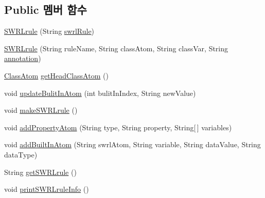 \subsection*{Public 멤버 함수}
\begin{DoxyCompactItemize}
\item 
\mbox{\hyperlink{classcom_1_1github_1_1aites_1_1framework_1_1rule_1_1_s_w_r_lrule_a984917d455fb3d9bf7aecf46bfef72cd}{S\+W\+R\+Lrule}} (String \mbox{\hyperlink{classcom_1_1github_1_1aites_1_1framework_1_1rule_1_1_s_w_r_lrule_adde1291a731073840a5ac9e535bf6f3f}{swrl\+Rule}})
\item 
\mbox{\hyperlink{classcom_1_1github_1_1aites_1_1framework_1_1rule_1_1_s_w_r_lrule_ae70ff52287865719636e6c63ece1fcd2}{S\+W\+R\+Lrule}} (String rule\+Name, String class\+Atom, String class\+Var, String \mbox{\hyperlink{classcom_1_1github_1_1aites_1_1framework_1_1rule_1_1_s_w_r_lrule_af98a0b14045d483b30ad511f0627fe3f}{annotation}})
\item 
\mbox{\hyperlink{classcom_1_1github_1_1aites_1_1framework_1_1rule_1_1_s_w_r_lrule_1_1_class_atom}{Class\+Atom}} \mbox{\hyperlink{classcom_1_1github_1_1aites_1_1framework_1_1rule_1_1_s_w_r_lrule_ac1db206d60cb8bea838593d3e0dcfd02}{get\+Head\+Class\+Atom}} ()
\item 
void \mbox{\hyperlink{classcom_1_1github_1_1aites_1_1framework_1_1rule_1_1_s_w_r_lrule_a4bdc9396085aa17600949d679657c2ad}{update\+Bulit\+In\+Atom}} (int bulit\+In\+Index, String new\+Value)
\item 
void \mbox{\hyperlink{classcom_1_1github_1_1aites_1_1framework_1_1rule_1_1_s_w_r_lrule_a8b6f04d7d532e8150e4be3ba796c28e9}{make\+S\+W\+R\+Lrule}} ()
\item 
void \mbox{\hyperlink{classcom_1_1github_1_1aites_1_1framework_1_1rule_1_1_s_w_r_lrule_ac6d5eaf0c61fd53ba7934558557c2f9a}{add\+Property\+Atom}} (String type, String property, String\mbox{[}$\,$\mbox{]} variables)
\item 
void \mbox{\hyperlink{classcom_1_1github_1_1aites_1_1framework_1_1rule_1_1_s_w_r_lrule_a59ae07c448962dabb798a34e54b5e72b}{add\+Built\+In\+Atom}} (String swrl\+Atom, String variable, String data\+Value, String data\+Type)
\item 
String \mbox{\hyperlink{classcom_1_1github_1_1aites_1_1framework_1_1rule_1_1_s_w_r_lrule_ab194dfde2668dca1f79b533695d71e67}{get\+S\+W\+R\+Lrule}} ()
\item 
void \mbox{\hyperlink{classcom_1_1github_1_1aites_1_1framework_1_1rule_1_1_s_w_r_lrule_ac24b01677beb4d4004f41cf1da585497}{print\+S\+W\+R\+Lrule\+Info}} ()
\end{DoxyCompactItemize}
